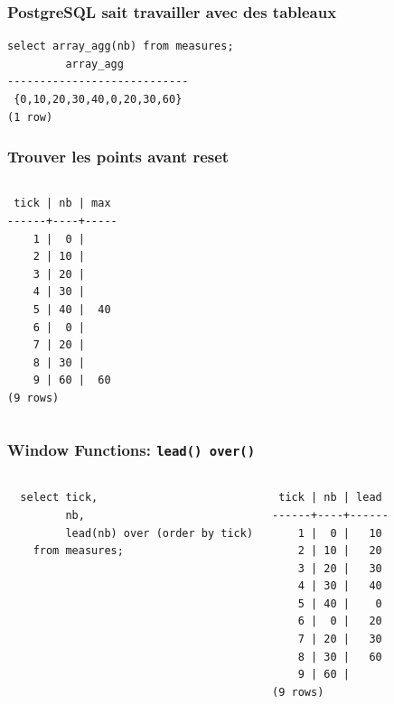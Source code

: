 \documentclass{beamer}
\begin{document}
\begin{frame}[fragile]
  \frametitle{PostgreSQL sait travailler avec des tableaux}

\begin{verbatim}
select array_agg(nb) from measures;
         array_agg          
----------------------------
 {0,10,20,30,40,0,20,30,60}
(1 row)
\end{verbatim}
\end{frame}

\begin{frame}[fragile]
  \frametitle{Trouver les points avant reset}

\begin{columns}
\begin{verbatim}
 tick | nb | max 
------+----+-----
    1 |  0 |    
    2 | 10 |    
    3 | 20 |    
    4 | 30 |    
    5 | 40 |  40
    6 |  0 |    
    7 | 20 |    
    8 | 30 |    
    9 | 60 |  60
(9 rows)
\end{verbatim}
\end{columns}
\end{frame}

\begin{frame}[fragile]
  \frametitle{Window Functions: \texttt{lead() over()}}

\begin{columns}
\begin{verbatim}
  select tick,
         nb,
         lead(nb) over (order by tick)
    from measures;
\end{verbatim}

\begin{verbatim}
 tick | nb | lead 
------+----+------
    1 |  0 |   10
    2 | 10 |   20
    3 | 20 |   30
    4 | 30 |   40
    5 | 40 |    0
    6 |  0 |   20
    7 | 20 |   30
    8 | 30 |   60
    9 | 60 |     
(9 rows)
\end{verbatim}
\end{columns}
\end{frame}
\end{document}
